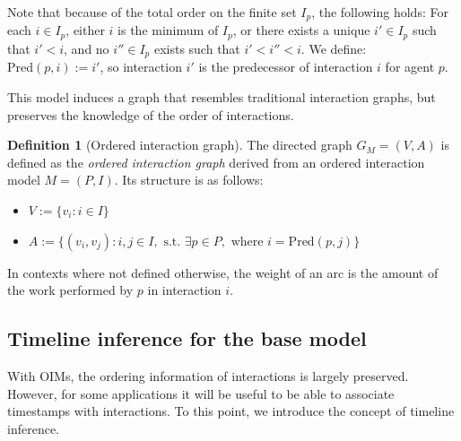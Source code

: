 \documentclass[a4paper,11pt]{book}
\newcommand{\pred}{\mathrm{Pred}}
\theoremstyle{definition}
\newtheorem{definition}{Definition}
\begin{document}
Note that because of the total order on the finite set $I_p$, the following holds:
For each $i \in I_p$, either $i$ is the minimum of $I_p$, or there exists
a unique $i' \in I_p$ such that $i' < i$, and no $i'' \in I_p$ exists such that
$i' < i'' < i$. We define: $\pred(p, i) := i'$, so interaction $i'$ is the predecessor
of interaction $i$ for agent $p$.

  
This model induces a graph that resembles traditional interaction graphs, but preserves the knowledge
of the order of interactions.
\begin{definition}[Ordered interaction graph]
    The directed graph $G_M = (V, A)$ is defined as the \emph{ordered interaction graph} derived from an ordered interaction model $M = (P,I)$.
    Its structure is as follows:

    \begin{itemize}
        \item $V := \{ v_{i} : i \in I\}$\\
        \item $A := \{ (v_{i}, v_{j}) : i, j \in I, \mbox{ s.t. } \exists p \in P, \mbox{ where } i = \pred(p, j)\}$
    \end{itemize}

    In contexts where not defined otherwise, the weight of an arc is the amount of the work performed by $p$ in
    interaction $i$. 
\end{definition}

\subsection{Timeline inference for the base model}

With OIMs, the ordering information of interactions is largely preserved. However, for some
applications it will be useful to be able to associate timestamps with interactions. To
this point, we introduce the concept of timeline inference.
\end{document}
